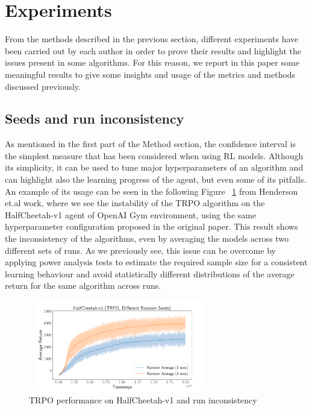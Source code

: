 \documentclass{article}
\begin{document}
\section{Experiments}
From the methods described in the previous section, different experiments have been carried out by each author in order to prove their results and highlight the issues present in some algorithms. For this reason, we report in this paper some meaningful results to give some insights and usage of the metrics and methods discussed previously.
\subsection{Seeds and run inconsistency}
As mentioned in the first part of the Method section, the confidence interval is the simplest measure that has been considered when using RL models. Although its simplicity, it can be used to tune major hyperparameters of an algorithm and can highlight also the learning progress of the agent, but even some of its pitfalls. An example of its usage can be seen in the following Figure ~\ref{fig:sample_size} from Henderson et.al work, where we see the instability of the TRPO \cite{TRPO} algorithm on the HalfCheetah-v1 agent of OpenAI Gym environment, using the same hyperparameter configuration proposed in the original paper. This result shows the inconsistency of the algorithms, even by averaging the models across two different sets of runs. As we previously see, this issue can be overcome by applying power analysis tests to estimate the required sample size for a consistent learning behaviour and avoid statistically different distributions of the average return for the same algorithm across runs.
\begin{figure}[!]
	\centering
	\includegraphics[width=8cm, height=4cm]{./images/sample_size_dist.png}
	\caption{TRPO performance on HalfCheetah-v1 and run inconsistency~\cite{DRL01}}
	\label{fig:sample_size}
\end{figure}
\end{document}
